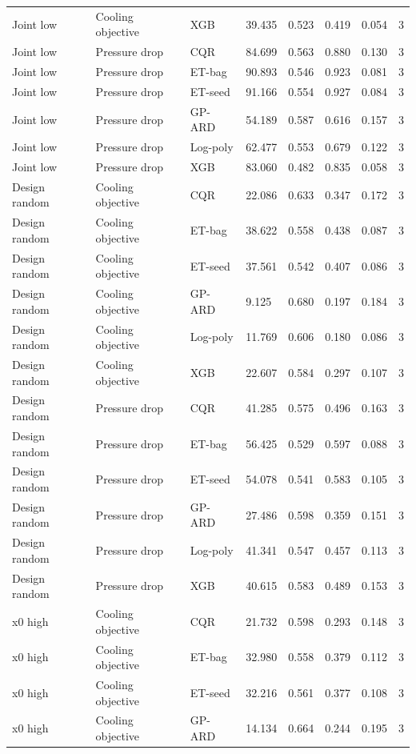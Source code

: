 \begin{longtable}{llllllll}
Joint low & Cooling objective & XGB & 39.435 & 0.523 & 0.419 & 0.054 & 3\\
Joint low & Pressure drop & CQR & 84.699 & 0.563 & 0.880 & 0.130 & 3\\
Joint low & Pressure drop & ET-bag & 90.893 & 0.546 & 0.923 & 0.081 & 3\\
Joint low & Pressure drop & ET-seed & 91.166 & 0.554 & 0.927 & 0.084 & 3\\
Joint low & Pressure drop & GP-ARD & 54.189 & 0.587 & 0.616 & 0.157 & 3\\
Joint low & Pressure drop & Log-poly & 62.477 & 0.553 & 0.679 & 0.122 & 3\\
Joint low & Pressure drop & XGB & 83.060 & 0.482 & 0.835 & 0.058 & 3\\
Design random & Cooling objective & CQR & 22.086 & 0.633 & 0.347 & 0.172 & 3\\
Design random & Cooling objective & ET-bag & 38.622 & 0.558 & 0.438 & 0.087 & 3\\
Design random & Cooling objective & ET-seed & 37.561 & 0.542 & 0.407 & 0.086 & 3\\
Design random & Cooling objective & GP-ARD & 9.125 & 0.680 & 0.197 & 0.184 & 3\\
Design random & Cooling objective & Log-poly & 11.769 & 0.606 & 0.180 & 0.086 & 3\\
Design random & Cooling objective & XGB & 22.607 & 0.584 & 0.297 & 0.107 & 3\\
Design random & Pressure drop & CQR & 41.285 & 0.575 & 0.496 & 0.163 & 3\\
Design random & Pressure drop & ET-bag & 56.425 & 0.529 & 0.597 & 0.088 & 3\\
Design random & Pressure drop & ET-seed & 54.078 & 0.541 & 0.583 & 0.105 & 3\\
Design random & Pressure drop & GP-ARD & 27.486 & 0.598 & 0.359 & 0.151 & 3\\
Design random & Pressure drop & Log-poly & 41.341 & 0.547 & 0.457 & 0.113 & 3\\
Design random & Pressure drop & XGB & 40.615 & 0.583 & 0.489 & 0.153 & 3\\
x0 high & Cooling objective & CQR & 21.732 & 0.598 & 0.293 & 0.148 & 3\\
x0 high & Cooling objective & ET-bag & 32.980 & 0.558 & 0.379 & 0.112 & 3\\
x0 high & Cooling objective & ET-seed & 32.216 & 0.561 & 0.377 & 0.108 & 3\\
x0 high & Cooling objective & GP-ARD & 14.134 & 0.664 & 0.244 & 0.195 & 3\\

\end{longtable}
